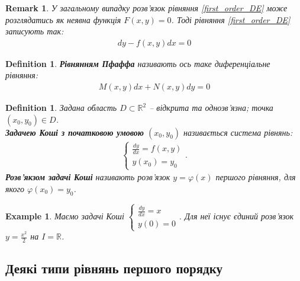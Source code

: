 \documentclass[a4paper, 10pt]{article}
\theoremstyle{theoremdd}
\theoremstyle{theoremdd}
\newtheorem{definition}[theorem]{Definition}
\theoremstyle{theoremdd}
\theoremstyle{theoremdd}
\newtheorem{example}[theorem]{Example}
\theoremstyle{theoremdd}
\theoremstyle{theoremdd}
\newtheorem{remark}[theorem]{Remark}
\theoremstyle{theoremdd}
\theoremstyle{theoremdd}
\begin{document}
	\begin{remark}
	У загальному випадку розв'язок рівняння \eqref{first_order_DE} може розглядатись як неявна функція $F(x,y)=0$. Тоді рівняння \eqref{first_order_DE} записують так:
	\begin{align*}
	dy - f(x,y)dx=0
	\end{align*}
	\end{remark}
	
	\begin{definition}
 \textbf{Рівнянням Пфаффа} називають ось таке диференціальне рівняння:
	\begin{align}
	M(x,y)dx + N(x,y)dy=0
	\end{align}
	\end{definition}

	\begin{definition}
 Задана область $D \subset \mathbb{R}^2$ -- відкрита та однозв'язна; точка $(x_0, y_0) \in D$.\\
	\textbf{Задачею Коші з початковою умовою} $(x_0,y_0)$ називається система рівнянь:
	\begin{align*}
	\begin{cases}
	\displaystyle \frac{dy}{dx}=f(x,y)\\
	y(x_0)=y_0
	\end{cases}.
	\end{align*}
	\textbf{Розв'якзом задачі Коші} називають розв'язок $y=\varphi(x)$ першого рівняння, для якого $\varphi(x_0)=y_0$.
	\end{definition}
	
	\begin{example}
	Маємо задачі Коші $ \begin{cases} \displaystyle \frac{dy}{dx}=x \\ y(0)=0 \end{cases}$. Для неї існує єдиний розв'язок $\displaystyle y = \frac{x^2}{2}$ на $I=\mathbb{R}$.
	\end{example}
	
	\subsection{Деякі типи рівнянь першого порядку}
\end{document}
